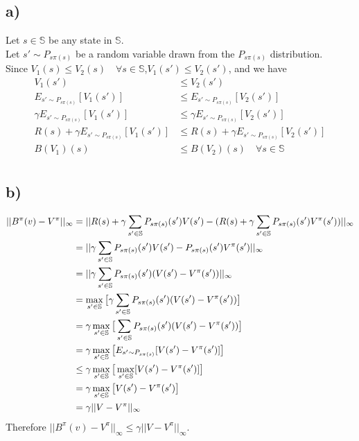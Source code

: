 \documentclass[11pt]{article}
\begin{document}
\subsection*{a)}
Let $s \in \mathbb{S}$ be any state in $\mathbb{S}$.\\
Let $s' \sim P_{s \pi(s)}$ be a random variable drawn from the $P_{s \pi(s)}$ distribution.\\
Since $V_1(s) \le V_2(s) \quad \forall s \in \mathbb{S}$,\quad$V_1(s') \le V_2(s')$, and we have
\begin{align*}
    V_1(s') &\le V_2(s') \\
    E_{s' \sim P_{s \pi(s)}}[V_1(s')] &\le E_{s' \sim P_{s \pi(s)}}[V_2(s')] \\
    \gamma E_{s' \sim P_{s \pi(s)}}[V_1(s')] &\le \gamma E_{s' \sim P_{s \pi(s)}}[V_2(s')] \\
    R(s) + \gamma E_{s' \sim P_{s \pi(s)}}[V_1(s')] &\le R(s) + \gamma E_{s' \sim P_{s \pi(s)}}[V_2(s')] \\
    B(V_1)(s) &\le B(V_2)(s) \quad \forall s \in \mathbb{S} \\
\end{align*}

\subsection*{b)}
\begin{align*}
    ||B^{\pi}(v) - V^{\pi}||_{\infty} &= ||R(s) + \gamma \sum_{s' \in \mathbb{S}} P_{s \pi(s)}(s') V(s') - (R(s) + \gamma \sum_{s' \in \mathbb{S}} P_{s \pi(s)}(s') V^{\pi}(s')) ||_{\infty} \\
                                    &= ||\gamma \sum_{s' \in \mathbb{S}} P_{s \pi(s)}(s') V(s') - P_{s \pi(s)}(s') V^{\pi}(s') ||_{\infty} \\
                                    &= ||\gamma \sum_{s' \in \mathbb{S}} P_{s \pi(s)}(s') (V(s') - V^{\pi}(s')) ||_{\infty} \\
                                    &= \max_{s' \in \mathbb{S}} \big[ \gamma \sum_{s' \in \mathbb{S}} P_{s \pi(s)}(s') (V(s') - V^{\pi}(s')) \big] \\
                                    &= \gamma \max_{s' \in \mathbb{S}} \big[ \sum_{s' \in \mathbb{S}} P_{s \pi(s)}(s') (V(s') - V^{\pi}(s')) \big] \\
                                    &= \gamma \max_{s' \in \mathbb{S}} \big[ E_{s' \sim P_{s \pi(s)}}[V(s') - V^{\pi}(s')] \big] \\
                                    &\le \gamma \max_{s' \in \mathbb{S}} \big[ \max_{s' \in \mathbb{S}}[V(s') - V^{\pi}(s')] \big] \\
                                    &= \gamma \max_{s' \in \mathbb{S}} \big[ V(s') - V^{\pi}(s') \big] \\
                                    &= \gamma || V - V^{\pi} ||_{\infty} \\
\end{align*}
Therefore $||B^{\pi}(v) - V^{\pi}||_{\infty} \le \gamma || V - V^{\pi} ||_{\infty}$. \\
\end{document}

